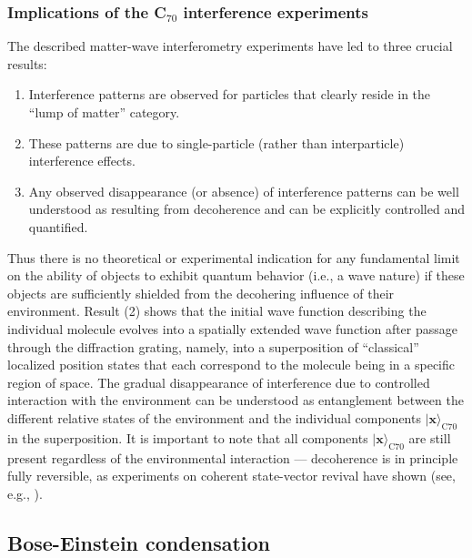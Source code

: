 \documentclass[12pt,aps,floatfix,amsmath,amssymb,showpacs,nofootinbib]{revtex4-2}
\newcommand{\bn}{\begin{enumerate}} \newcommand{\en}{\end{enumerate}}
\newcommand{\ket}[1]{\ensuremath{|{#1\rangle}}}
\begin{document}
\subsubsection{Implications of the C$_{70}$ interference experiments}

The described matter-wave interferometry experiments have led to three
crucial results:

\bn

\item Interference patterns are observed for particles that clearly
  reside in the ``lump of matter'' category.
  
\item These patterns are due to single-particle (rather than
  interparticle) interference effects.
  
\item Any observed disappearance (or absence) of interference patterns
  can be well understood as resulting from decoherence and can be
  explicitly controlled and quantified.

\en

Thus there is no theoretical or experimental indication for any
fundamental limit on the ability of objects to exhibit quantum
behavior (i.e., a wave nature) if these objects are sufficiently
shielded from the decohering influence of their environment. Result
(2) shows that the initial wave function describing the individual
molecule evolves into a spatially extended wave function after passage
through the diffraction grating, namely, into a superposition of
``classical'' localized position states that each correspond to the
molecule being in a specific region of space. The gradual
disappearance of interference due to controlled interaction with the
environment can be understood as entanglement between the different
relative states of the environment and the individual components
$\ket{\mathbf{x}}_{\text{C}70}$ in the superposition. It is important
to note that all components $\ket{\mathbf{x}}_{\text{C}70}$ are still
present regardless of the environmental interaction --- decoherence is
in principle fully reversible, as experiments on coherent state-vector
revival have shown (see, e.g., \cite{Raimond:1997:um}).


\subsection{Bose-Einstein condensation} \label{sec:bose}
\end{document}
